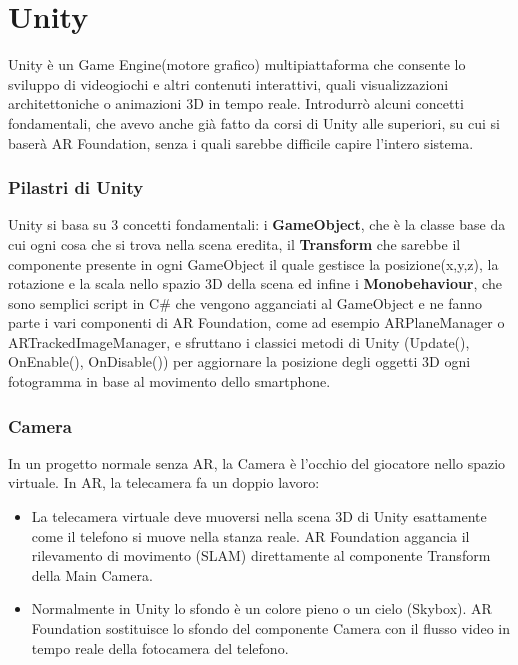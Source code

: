 \chapter{Unity}
Unity è un Game Engine(motore grafico)\cite{Unity-1}\cite{Unity-2}\cite{Unity-3} multipiattaforma che consente lo sviluppo di videogiochi e altri contenuti interattivi, quali visualizzazioni architettoniche o animazioni 3D in tempo reale.
Introdurrò alcuni concetti fondamentali, che avevo anche già fatto da corsi di Unity alle superiori, su cui si baserà AR Foundation, senza i quali sarebbe difficile capire l'intero sistema.

\subsection{Pilastri di Unity}

Unity si basa su 3 concetti fondamentali: i \textbf{GameObject}, che è la classe base da cui ogni cosa che si trova nella scena eredita, il \textbf{Transform} che sarebbe il componente presente in ogni GameObject il quale gestisce la posizione(x,y,z), la rotazione e la scala nello spazio 3D della scena ed infine i \textbf{Monobehaviour}, che sono semplici script in C\# che vengono agganciati al GameObject e ne fanno parte i vari componenti di AR Foundation, come ad esempio ARPlaneManager o ARTrackedImageManager, e sfruttano i classici metodi di Unity (Update(), OnEnable(), OnDisable()) per aggiornare la posizione degli oggetti 3D ogni fotogramma in base al movimento dello smartphone.

\subsection{Camera}
In un progetto normale senza AR, la Camera è l'occhio del giocatore nello spazio virtuale. In AR, la telecamera fa un doppio lavoro:

\begin{itemize}
    \item  La telecamera virtuale deve muoversi nella scena 3D di Unity esattamente come il telefono si muove nella stanza reale. AR Foundation aggancia il rilevamento di movimento (SLAM) direttamente al componente Transform della Main Camera.
    \item Normalmente in Unity lo sfondo è un colore pieno o un cielo (Skybox). AR Foundation sostituisce lo sfondo del componente Camera con il flusso video in tempo reale della fotocamera del telefono.
\end{itemize}
 
